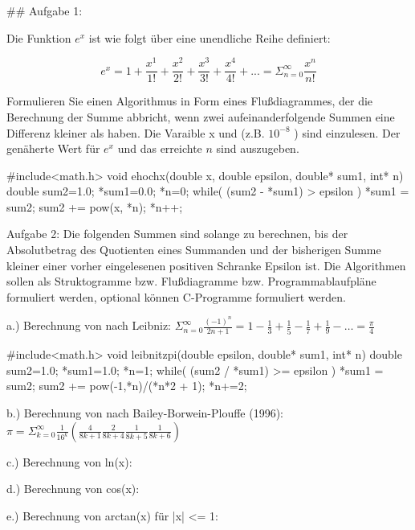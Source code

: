 ## Aufgabe 1:

Die Funktion $ e^x $ ist wie folgt über eine unendliche Reihe definiert:

$$
e^x = 1 + \frac{x^1}{1!} + \frac{x^2}{2!} + \frac{x^3}{3!} + \frac{x^4}{4!} + ...
= \Sigma_{n=0}^{\infty} \frac{x^n}{n!}
$$

Formulieren Sie einen Algorithmus in Form eines Flußdiagrammes, der die Berechnung der Summe abbricht, wenn zwei aufeinanderfolgende Summen eine Differenz kleiner als \epsilon haben.
Die Varaible x und \epsilon (z.B. $ 10^{-8} $ ) sind einzulesen. Der genäherte Wert für $ e^x $ und das erreichte $ n $ sind auszugeben.

    #include<math.h>
    void ehochx(double x, double epsilon, double* sum1, int* n){
      double sum2=1.0;
      *sum1=0.0;
      *n=0;
      while( (sum2 - *sum1) > epsilon  ){
        *sum1 = sum2;
        sum2 += pow(x, *n);
        *n++;
      }
    }

Aufgabe 2:
Die folgenden Summen sind solange zu berechnen, bis der Absolutbetrag des Quotienten eines Summanden und der bisherigen Summe kleiner einer vorher eingelesenen positiven Schranke Epsilon ist. Die Algorithmen sollen als Struktogramme bzw. Flußdiagramme bzw. Programmablaufpläne formuliert werden, optional können C-Programme formuliert werden.

a.) Berechnung von \pi nach Leibniz: $ \Sigma_{n=0}^{\infty} \frac{(-1)^n}{2n+1} = 1-\frac{1}{3}+\frac{1}{5}-\frac{1}{7}+\frac{1}{9}-\ldots=\frac{\pi}{4} $

    #include<math.h>
    void leibnitzpi(double epsilon, double* sum1, int* n){
      double sum2=1.0;
      *sum1=1.0;
      *n=1;
      while( (sum2 / *sum1) >= epsilon ){
        *sum1 = sum2;
        sum2 += pow(-1,*n)/(*n*2 + 1);
        *n+=2;
      }
    }

b.) Berechnung von \pi nach Bailey-Borwein-Plouffe (1996): $ \pi = \Sigma_{k=0}^{\infty} \frac{1}{16^k} \left( \frac{4}{8k+1} \frac{2}{8k+4} \frac{1}{8k+5} \frac{1}{8k+6} \right)  $

c.) Berechnung von ln(x):

d.) Berechnung von cos(x):

e.) Berechnung von arctan(x) für |x| <= 1:


